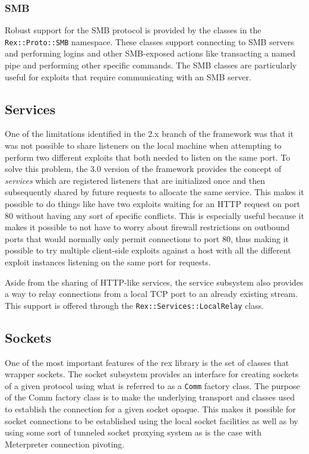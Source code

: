 \documentclass{report}
\begin{document}
            \subsubsection{SMB}

\par
Robust support for the SMB protocol is provided by the classes in
the \texttt{Rex::Proto::SMB} namespace.  These classes support
connecting to SMB servers and performing logins and other
SMB-exposed actions like transacting a named pipe and performing
other specific commands.  The SMB classes are particularly useful
for exploits that require communicating with an SMB server.

        \subsection{Services}

\par
One of the limitations identified in the 2.x branch of the framework
was that it was not possible to share listeners on the local machine
when attempting to perform two different exploits that both needed
to listen on the same port.  To solve this problem, the 3.0 version
of the framework provides the concept of \textit{services} which are
registered listeners that are initialized once and then subsequently
shared by future requests to allocate the same service.  This makes
it possible to do things like have two exploits waiting for an HTTP
request on port 80 without having any sort of specific conflicts.
This is especially useful because it makes it possible to not have
to worry about firewall restrictions on outbound ports that would
normally only permit connections to port 80, thus making it possible
to try multiple client-side exploits against a host with all the
different exploit instances listening on the same port for requests.

\par
Aside from the sharing of HTTP-like services, the service subsystem
also provides a way to relay connections from a local TCP port to an
already existing stream.  This support is offered through the
\texttt{Rex::Services::LocalRelay} class.

        \subsection{Sockets}

\par
One of the most important features of the rex library is the set of
classes that wrapper sockets.  The socket subsystem provides an
interface for creating sockets of a given protocol using what is
referred to as a \texttt{Comm} factory class.  The purpose of the
Comm factory class is to make the underlying transport and classes
used to establish the connection for a given socket opaque.  This
makes it possible for socket connections to be established using the
local socket facilities as well as by using some sort of tunneled
socket proxying system as is the case with Meterpreter connection
pivoting.
\end{document}
